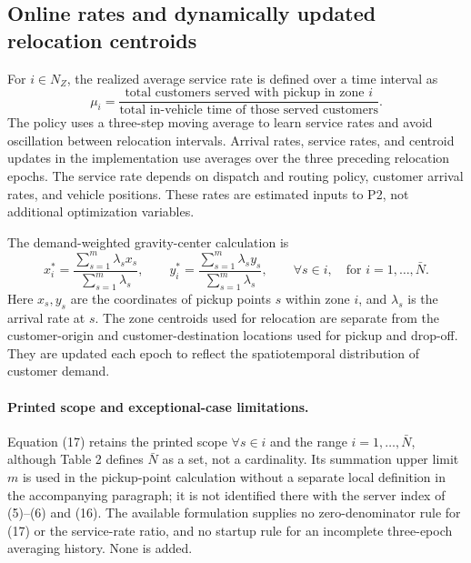 \documentclass{article}
\begin{document}
\subsection*{Online rates and dynamically updated relocation centroids}
For $i\in N_Z$, the realized average service rate is defined over a time interval as
\[
\mu_i=
\frac{\text{total customers served with pickup in zone }i}
{\text{total in-vehicle time of those served customers}}.
\]
The policy uses a three-step moving average to learn service rates and avoid oscillation between relocation intervals. Arrival rates, service rates, and centroid updates in the implementation use averages over the three preceding relocation epochs. The service rate depends on dispatch and routing policy, customer arrival rates, and vehicle positions. These rates are estimated inputs to P2, not additional optimization variables.

The demand-weighted gravity-center calculation is
\begin{equation}
x_i^*=\frac{\sum_{s=1}^{m}\lambda_s x_s}{\sum_{s=1}^{m}\lambda_s},
\qquad
y_i^*=\frac{\sum_{s=1}^{m}\lambda_s y_s}{\sum_{s=1}^{m}\lambda_s},
\qquad\forall s\in i,\quad\text{for }i=1,\ldots,\bar N.
\tag{17}
\end{equation}
Here $x_s,y_s$ are the coordinates of pickup points $s$ within zone $i$, and $\lambda_s$ is the arrival rate at $s$. The zone centroids used for relocation are separate from the customer-origin and customer-destination locations used for pickup and drop-off. They are updated each epoch to reflect the spatiotemporal distribution of customer demand.

\paragraph{Printed scope and exceptional-case limitations.}
Equation (17) retains the printed scope $\forall s\in i$ and the range $i=1,\ldots,\bar N$, although Table 2 defines $\bar N$ as a set, not a cardinality. Its summation upper limit $m$ is used in the pickup-point calculation without a separate local definition in the accompanying paragraph; it is not identified there with the server index of (5)--(6) and (16). The available formulation supplies no zero-denominator rule for (17) or the service-rate ratio, and no startup rule for an incomplete three-epoch averaging history. None is added.
\end{document}
